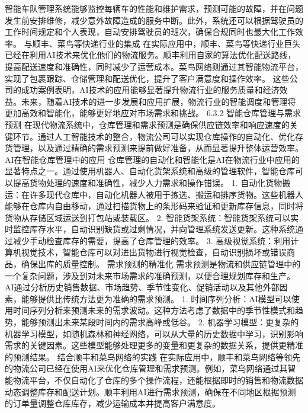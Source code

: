 智能车队管理系统能够监控每辆车的性能和维护需求，预测可能的故障，并在问题发生前安排维修，减少意外故障造成的服务中断。此外，系统还可以根据驾驶员的工作时间规定和个人表现，自动安排驾驶员的班次，确保合规同时也最大化工作效率。
与顺丰、菜鸟等快递行业的集成
在实际应用中，顺丰、菜鸟等快递行业巨头已经在利用AI技术来优化他们的物流服务。顺丰利用自家的算法优化配送路线，提高配送速度和准确性，同时减少了运营成本。菜鸟网络则通过其智能物流平台，实现了包裹跟踪、仓储管理和配送优化，提升了客户满意度和操作效率。
这些公司的成功案例表明，AI技术的应用能够显著提升物流行业的服务质量和经济效益。未来，随着AI技术的进一步发展和应用扩展，物流行业的智能调度和管理将更加高效和智能化，能够更好地应对市场需求和挑战。
6.3.2 智能仓库管理与需求预测
在现代物流系统中，仓库管理和需求预测是确保供应链效率和响应速度的关键环节。通过人工智能技术的整合，物流公司可以实现仓库操作的自动化、优化存货管理，以及通过精确的需求预测来提前做好准备，从而显著提升整体运营效率。
AI在智能仓库管理中的应用
仓库管理的自动化和智能化是AI在物流行业中应用的显著特点之一。通过使用机器人、自动化货架系统和高级的管理软件，智能仓库可以提高货物处理的速度和准确性，减少人力需求和操作错误。
1.	自动化货物搬运：在许多现代仓库中，自动化机器人被用于拣选、搬运和排序货物。这些机器人能够在仓库内自由移动，通过扫描货物上的条形码来验证和更新库存信息，同时将货物从存储区域运送到打包站或装载区。
2.	智能货架系统：智能货架系统可以实时监控库存水平，自动识别缺货或过剩情况，并向管理系统发送更新。这种系统通过减少手动检查库存的需要，提高了仓库管理的效率。
3.	高级视觉系统：利用计算机视觉技术，智能仓库可以对进出货物进行视觉检查，自动识别损坏或错误商品，确保出库的质量控制。
需求预测的精准化
需求预测是物流和供应链管理中的一个复杂问题，涉及到对未来市场需求的准确预测，以便合理规划库存和生产。AI通过分析历史销售数据、市场趋势、季节性变化、促销活动以及其他外部因素，能够提供比传统方法更为准确的需求预测。
1.	时间序列分析：AI模型可以使用时间序列分析来预测未来的需求波动。这种方法考虑了数据中的季节性模式和趋势，能够预测出未来某段时间内的需求高峰或低谷。
2.	机器学习模型：更复杂的机器学习模型，如随机森林和神经网络，可以从大量的历史数据中学习，识别影响需求的关键因素。这些模型能够处理更多的变量和更复杂的数据关系，提供更精准的预测结果。
结合顺丰和菜鸟网络的实践
在实际应用中，顺丰和菜鸟网络等领先的物流公司已经在使用AI来优化仓库管理和需求预测。例如，菜鸟网络通过其智能物流平台，不仅自动化了仓库的多个操作流程，还能根据即时的销售和物流数据动态调整库存和配送计划。顺丰利用AI进行需求预测，确保在不同地区根据预测的订单量调整仓库库存，减少运输成本并提高客户满意度。


